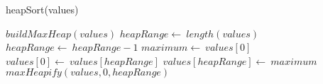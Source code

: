 \documentclass[a4paper,10pt]{article}
\begin{document}
\begin{algorithm}
\caption{heapSort(values)}
\begin{algorithmic}[5]

\STATE {}
\STATE {}
  \STATE \(buildMaxHeap(values)\)
  \STATE \(heapRange\gets\ length(values)\)
    \STATE \(heapRange\gets\ heapRange-1\)
    \STATE \(maximum\gets\ values[0]\)
    \STATE \(values[0]\gets\ values[heapRange]\)
    \STATE \(values[heapRange]\gets\ maximum\)
    \STATE \(maxHeapify(values,0,heapRange)\)
  \ENDFOR

\end{algorithmic}
\end{algorithm}
\end{document}
